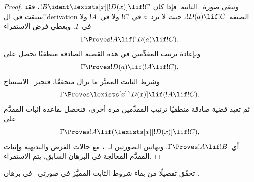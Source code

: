 \documentclass[../../../include/open-logic-section]{subfiles}
\begin{document}
\begin{proof}
وتبقى صورة~\QR{} الثانية. فإذا كان
$!B \ident \lexists[x][!D(x)] \lif !C$، فقد سبقت في ال!!{derivation}
الصيغة~$!D(a) \lif !C$، حيث لا يرد~$a$ في~$!C$ ولا في~$!A$ ولا في
$\Gamma$. ويعطي فرض الاستقراء
\[
  \Gamma \Proves !A \lif (!D(a) \lif !C).
\]
وبإعادة ترتيب المقدِّمين في هذه القضية الصادقة منطقيًا نحصل على
\[
  \Gamma \Proves !D(a) \lif (!A \lif !C).
\]
وشرط الثابت المميَّز ما يزال متحققًا، فتجيز~\QR{} الاستنتاج
\[
  \Gamma \Proves \lexists[x][!D(x)] \lif (!A \lif !C).
\]
ثم تعيد قضية صادقة منطقيًا ترتيب المقدِّمين مرة أخرى، فنحصل بقاعدة
إثبات المقدَّم على
\[
  \Gamma \Proves !A \lif (\lexists[x][!D(x)] \lif !C),
\]
أي~$\Gamma \Proves !A \lif !B$. وبهاتين الصورتين لـ~\QR{}، مع حالات
الفرض والبديهية وإثبات المقدَّم المعالجة في البرهان السابق، يتم الاستقراء.
\end{proof}

\begin{prob}
  تحقّق تفصيلًا من بقاء شروط الثابت المميَّز في صورتي~\QR{} في برهان
  .
\end{prob}
\end{document}

